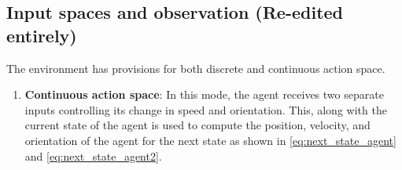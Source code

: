 \subsection{Input spaces and observation (Re-edited entirely)} 
\label{subsec:action-space}
The environment has provisions for both discrete and continuous action space.
\begin{enumerate}
    \item \textbf{Continuous action space}: In this mode, the agent receives two separate inputs controlling its change in speed and orientation. This, along with the current state of the agent is used to compute the position, velocity, and orientation of the agent for the next state as shown in \autoref{eq:next_state_agent} and \autoref{eq:next_state_agent2}.\\
    

\end{enumerate}
